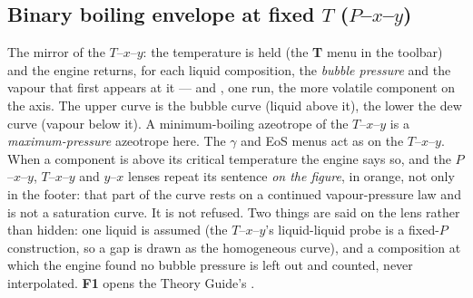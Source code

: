 \documentclass[11pt,a4paper]{article}
\begin{document}
\subsection{Binary boiling envelope at fixed $T$ ($P$--$x$--$y$)}\label{sec:explorer-pxy}
The mirror of the $T$--$x$--$y$: the temperature is held (the \textbf{T}
menu in the toolbar) and the engine returns, for each liquid composition, the
\emph{bubble pressure} and the vapour that first appears at it ---
 and , one run, the more volatile
component on the axis.  The upper curve is the bubble curve (liquid above
it), the lower the dew curve (vapour below it).  A minimum-boiling azeotrope
of the $T$--$x$--$y$ is a \emph{maximum-pressure} azeotrope here.  The
$\gamma$ and EoS menus act as on the $T$--$x$--$y$.  When a component is
above its critical temperature the engine says so, and the $P$--$x$--$y$,
$T$--$x$--$y$ and $y$--$x$ lenses repeat its sentence \emph{on the figure}, in
orange, not only in the footer: that part of the curve rests on a continued
vapour-pressure law and is not a saturation curve.  It is not refused.  Two things are said on
the lens rather than hidden: one liquid is assumed (the $T$--$x$--$y$'s
liquid-liquid probe is a fixed-$P$ construction, so a gap is drawn as the
homogeneous curve), and a composition at which the engine found no bubble
pressure is left out and counted, never interpolated.  \textbf{F1} opens the
Theory Guide's .
\end{document}
